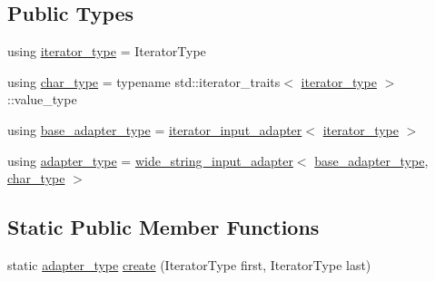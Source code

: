 \subsection*{Public Types}
\begin{DoxyCompactItemize}
\item 
using \hyperlink{structnlohmann_1_1detail_1_1iterator__input__adapter__factory_3_01IteratorType_00_01enable__if__0e86378a778d78dd2284e92dc30f4902_a1c42a47cd6cd71146cf2851d76165610}{iterator\+\_\+type} = Iterator\+Type
\item 
using \hyperlink{structnlohmann_1_1detail_1_1iterator__input__adapter__factory_3_01IteratorType_00_01enable__if__0e86378a778d78dd2284e92dc30f4902_aff521be1855964b6ec371eed2ca2590f}{char\+\_\+type} = typename std\+::iterator\+\_\+traits$<$ \hyperlink{structnlohmann_1_1detail_1_1iterator__input__adapter__factory_3_01IteratorType_00_01enable__if__0e86378a778d78dd2284e92dc30f4902_a1c42a47cd6cd71146cf2851d76165610}{iterator\+\_\+type} $>$\+::value\+\_\+type
\item 
using \hyperlink{structnlohmann_1_1detail_1_1iterator__input__adapter__factory_3_01IteratorType_00_01enable__if__0e86378a778d78dd2284e92dc30f4902_afd0218fc0657b5e04ab81ccc9dcda03d}{base\+\_\+adapter\+\_\+type} = \hyperlink{classnlohmann_1_1detail_1_1iterator__input__adapter}{iterator\+\_\+input\+\_\+adapter}$<$ \hyperlink{structnlohmann_1_1detail_1_1iterator__input__adapter__factory_3_01IteratorType_00_01enable__if__0e86378a778d78dd2284e92dc30f4902_a1c42a47cd6cd71146cf2851d76165610}{iterator\+\_\+type} $>$
\item 
using \hyperlink{structnlohmann_1_1detail_1_1iterator__input__adapter__factory_3_01IteratorType_00_01enable__if__0e86378a778d78dd2284e92dc30f4902_ae9fc94b1b95c5d4afd1ab3f9ccb93c1a}{adapter\+\_\+type} = \hyperlink{classnlohmann_1_1detail_1_1wide__string__input__adapter}{wide\+\_\+string\+\_\+input\+\_\+adapter}$<$ \hyperlink{structnlohmann_1_1detail_1_1iterator__input__adapter__factory_3_01IteratorType_00_01enable__if__0e86378a778d78dd2284e92dc30f4902_afd0218fc0657b5e04ab81ccc9dcda03d}{base\+\_\+adapter\+\_\+type}, \hyperlink{structnlohmann_1_1detail_1_1iterator__input__adapter__factory_3_01IteratorType_00_01enable__if__0e86378a778d78dd2284e92dc30f4902_aff521be1855964b6ec371eed2ca2590f}{char\+\_\+type} $>$
\end{DoxyCompactItemize}
\subsection*{Static Public Member Functions}
\begin{DoxyCompactItemize}
\item 
static \hyperlink{structnlohmann_1_1detail_1_1iterator__input__adapter__factory_3_01IteratorType_00_01enable__if__0e86378a778d78dd2284e92dc30f4902_ae9fc94b1b95c5d4afd1ab3f9ccb93c1a}{adapter\+\_\+type} \hyperlink{structnlohmann_1_1detail_1_1iterator__input__adapter__factory_3_01IteratorType_00_01enable__if__0e86378a778d78dd2284e92dc30f4902_aae2354d80ae95214a9da99c495003f6c}{create} (Iterator\+Type first, Iterator\+Type last)
\end{DoxyCompactItemize}



